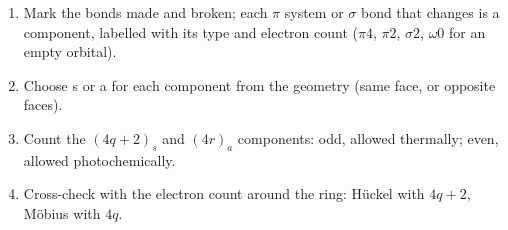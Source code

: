 \begin{method}\label{met:b3:pericyclic:components}
\begin{enumerate}
  \item Mark the bonds made and broken; each $\pi$ system or $\sigma$ bond that changes is a
        component, labelled with its type and electron count ($\pi4$, $\pi2$, $\sigma2$, $\omega0$ for
        an empty orbital).
  \item Choose s or a for each component from the geometry (same face, or
        opposite faces).
  \item Count the $(4q + 2)_s$ and $(4r)_a$ components: odd, allowed thermally; even, allowed
        photochemically.
  \item Cross-check with the electron count around the ring: Hückel with $4q + 2$,
        Möbius with $4q$.
\end{enumerate}
\end{method}

